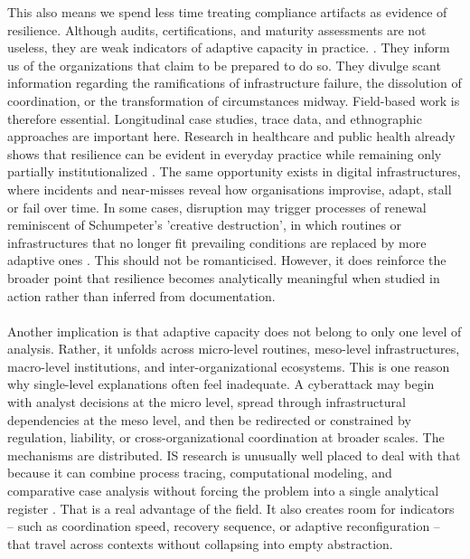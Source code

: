 This also means we spend less time treating compliance artifacts as evidence of resilience. Although audits, certifications, and maturity assessments are not useless, they are weak indicators of adaptive capacity in practice.  \autocite{skopik2016problem}. They inform us of the organizations that claim to be prepared to do so. They divulge scant information regarding the ramifications of infrastructure failure, the dissolution of coordination, or the transformation of circumstances midway. Field-based work is therefore essential. Longitudinal case studies, trace data, and ethnographic approaches are important here. Research in healthcare and public health already shows that resilience can be evident in everyday practice while remaining only partially institutionalized \autocite{kruk2017building,barasa2018what}. The same opportunity exists in digital infrastructures, where incidents and near-misses reveal how organisations improvise, adapt, stall or fail over time. In some cases, disruption may trigger processes of renewal reminiscent of Schumpeter's 'creative destruction', in which routines or infrastructures that no longer fit prevailing conditions are replaced by more adaptive ones  \autocite{schumpeter1942capitalism}. This should not be romanticised. However, it does reinforce the broader point that resilience becomes analytically meaningful when studied in action rather than inferred from documentation.\\
\\
Another implication is that adaptive capacity does not belong to only one level of analysis. Rather, it unfolds across micro-level routines, meso-level infrastructures, macro-level institutions, and inter-organizational ecosystems. This is one reason why single-level explanations often feel inadequate. A cyberattack may begin with analyst decisions at the micro level, spread through infrastructural dependencies at the meso level, and then be redirected or constrained by regulation, liability, or cross-organizational coordination at broader scales. The mechanisms are distributed. IS research is unusually well placed to deal with that because it can combine process tracing, computational modeling, and comparative case analysis without forcing the problem into a single analytical register \autocite{ostrom1990governing,vogus2007organizational,folke2010resilience}. That is a real advantage of the field. It also creates room for indicators -- such as coordination speed, recovery sequence, or adaptive reconfiguration -- that travel across contexts without collapsing into empty abstraction.\\
